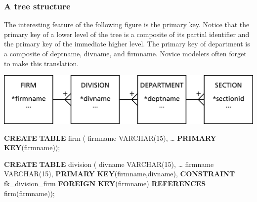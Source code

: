 \documentclass[
]{article}
\newenvironment{Shaded}{\begin{snugshade}}{\end{snugshade}}
\newcommand{\DataTypeTok}[1]{\textcolor[rgb]{0.13,0.29,0.53}{#1}}
\newcommand{\DecValTok}[1]{\textcolor[rgb]{0.00,0.00,0.81}{#1}}
\newcommand{\KeywordTok}[1]{\textcolor[rgb]{0.13,0.29,0.53}{\textbf{#1}}}
\newcommand{\NormalTok}[1]{#1}
\begin{document}
\hypertarget{a-tree-structure}{%
\subsubsection*{A tree structure}\label{a-tree-structure}}

The interesting feature of the following figure is the primary key.
Notice that the primary key of a lower level of the tree is a composite
of its partial identifier and the primary key of the immediate higher
level. The primary key of department is a composite of deptname,
divname, and firmname. Novice modelers often forget to make this
translation.

\includegraphics{Figures/Reference 1/r1-tree.png}

\begin{Shaded}
\begin{Highlighting}[]
\KeywordTok{CREATE} \KeywordTok{TABLE}\NormalTok{ firm (}
\NormalTok{    firmname        }\DataTypeTok{VARCHAR}\NormalTok{(}\DecValTok{15}\NormalTok{),}
\NormalTok{    … }
        \KeywordTok{PRIMARY} \KeywordTok{KEY}\NormalTok{(firmname));}
\end{Highlighting}
\end{Shaded}

\begin{Shaded}
\begin{Highlighting}[]
\KeywordTok{CREATE} \KeywordTok{TABLE}\NormalTok{ division (}
\NormalTok{    divname     }\DataTypeTok{VARCHAR}\NormalTok{(}\DecValTok{15}\NormalTok{),}
\NormalTok{    …}
\NormalTok{    firmname        }\DataTypeTok{VARCHAR}\NormalTok{(}\DecValTok{15}\NormalTok{),}
        \KeywordTok{PRIMARY} \KeywordTok{KEY}\NormalTok{(firmname,divname),}
        \KeywordTok{CONSTRAINT}\NormalTok{ fk\_division\_firm }
            \KeywordTok{FOREIGN} \KeywordTok{KEY}\NormalTok{(firmname) }\KeywordTok{REFERENCES}\NormalTok{ firm(firmname));}
\end{Highlighting}
\end{Shaded}
\end{document}
